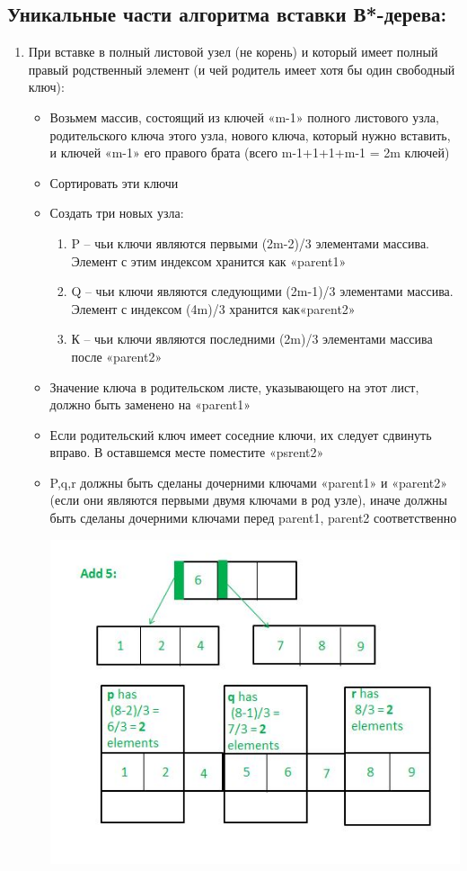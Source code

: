     \subsection{Уникальные части алгоритма вставки В*-дерева:}
    \begin{enumerate}
        \item При вставке в полный листовой узел (не корень) и который имеет полный правый родственный элемент (и чей родитель имеет хотя бы один свободный ключ):
        \begin{itemize}
            \item Возьмем массив, состоящий из ключей «m-1» полного листового узла, родительского ключа этого узла, нового ключа, который нужно вставить, и ключей «m-1» его правого брата (всего m-1+1+1+m-1 = 2m ключей) 
            \item Сортировать эти ключи 
            \item Создать три новых узла:
            \begin{enumerate}
                \item P – чьи ключи являются первыми (2m-2)/3 элементами массива. Элемент с этим индексом хранится как «parent1»
                \item Q – чьи ключи являются следующими (2m-1)/3 элементами массива. Элемент с индексом (4m)/3 хранится как«parent2»
                \item К – чьи ключи являются последними (2m)/3 элементами массива после «parent2»
            \end{enumerate}
            \item Значение ключа в родительском листе, указывающего на этот лист, должно быть заменено на «parent1»
            \item Если родительский ключ имеет соседние ключи, их следует сдвинуть вправо. В оставшемся месте поместите «psrent2»
            \item P,q,r должны быть сделаны дочерними ключами «parent1» и «parent2» (если они являются первыми двумя ключами в род узле), иначе должны быть сделаны дочерними ключами перед parent1, parent2 соответственно
            \begin{center}
                \includegraphics[width=0.7\linewidth]{gfg16.jpg} \par

\end{center}
\end{itemize}
\end{enumerate}
